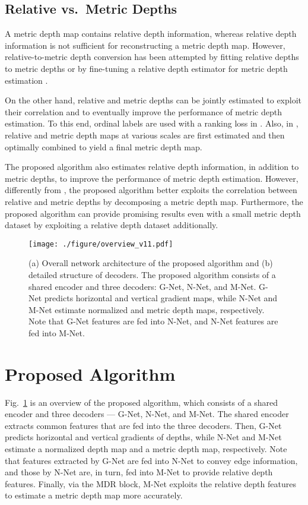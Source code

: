 \documentclass[runningheads]{llncs}
\begin{document}
\subsection{Relative vs.\ Metric Depths}
A metric depth map contains relative depth information, whereas relative depth information is not sufficient for reconstructing a metric depth map. However, relative-to-metric depth conversion has been attempted by fitting relative depths to metric depths \cite{ranftl2020, lienen2021monocular} or by fine-tuning a relative depth estimator for metric depth estimation \cite{ranftl2021vision}.

On the other hand, relative and metric depths can be jointly estimated to exploit their correlation and to eventually improve the performance of metric depth estimation. To this end, ordinal labels are used with a ranking loss in \cite{chen2016single}. Also, in \cite{lee2019monocular}, relative and metric depth maps at various scales are first estimated and then optimally combined to yield a final metric depth map.

The proposed algorithm also estimates relative depth information, in addition to metric depths, to improve the performance of metric depth estimation. However, differently from \cite{chen2016single, lee2019monocular}, the proposed algorithm better exploits the correlation between relative and metric depths by decomposing a metric depth map. Furthermore, the proposed algorithm can provide promising results even with a small metric depth dataset by exploiting a relative depth dataset additionally.

\begin{figure}[!t]
  \centering
   \texttt{[image: ./figure/overview\_v11.pdf]}
   \caption{ (a) Overall network architecture of the proposed algorithm and (b) detailed structure of decoders. The proposed algorithm consists of a shared encoder and three decoders: G-Net, N-Net, and M-Net. G-Net predicts horizontal and vertical gradient maps, while N-Net and M-Net estimate normalized and metric depth maps, respectively. Note that G-Net features are fed into N-Net, and N-Net features are fed into M-Net.}
   \label{fig:overview}
\end{figure}

\section{Proposed Algorithm}
\label{sec:proposd_algorithm}

Fig.~\ref{fig:overview} is an overview of the proposed algorithm, which consists of a shared encoder and three decoders --- G-Net, N-Net, and M-Net. The shared encoder extracts common features that are fed into the three decoders. Then, G-Net predicts horizontal and vertical gradients of depths, while N-Net and M-Net estimate a normalized depth map and a metric depth map, respectively. Note that features extracted by G-Net are fed into N-Net to convey edge information, and those by N-Net are, in turn, fed into M-Net to provide relative depth features. Finally, via the MDR block, M-Net exploits the relative depth features to estimate a metric depth map more accurately.
\end{document}

